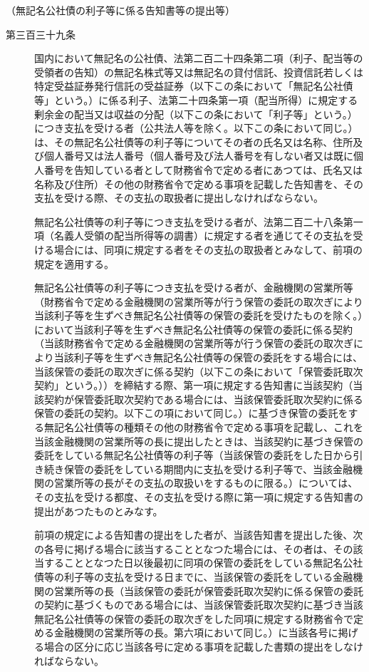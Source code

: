 \documentclass[twocolumn,a4j,10pt]{ltjtarticle}
\begin{document}
\noindent\hspace{10pt}（無記名公社債の利子等に係る告知書等の提出等）
\begin{description}
\item[第三百三十九条]国内において無記名の公社債、法第二百二十四条第二項（利子、配当等の受領者の告知）の無記名株式等又は無記名の貸付信託、投資信託若しくは特定受益証券発行信託の受益証券（以下この条において「無記名公社債等」という。）に係る利子、法第二十四条第一項（配当所得）に規定する剰余金の配当又は収益の分配（以下この条において「利子等」という。）につき支払を受ける者（公共法人等を除く。以下この条において同じ。）は、その無記名公社債等の利子等についてその者の氏名又は名称、住所及び個人番号又は法人番号（個人番号及び法人番号を有しない者又は既に個人番号を告知している者として財務省令で定める者にあつては、氏名又は名称及び住所）その他の財務省令で定める事項を記載した告知書を、その支払を受ける際、その支払の取扱者に提出しなければならない。
\item[]無記名公社債等の利子等につき支払を受ける者が、法第二百二十八条第一項（名義人受領の配当所得等の調書）に規定する者を通じてその支払を受ける場合には、同項に規定する者をその支払の取扱者とみなして、前項の規定を適用する。
\item[]無記名公社債等の利子等につき支払を受ける者が、金融機関の営業所等（財務省令で定める金融機関の営業所等が行う保管の委託の取次ぎにより当該利子等を生ずべき無記名公社債等の保管の委託を受けたものを除く。）において当該利子等を生ずべき無記名公社債等の保管の委託に係る契約（当該財務省令で定める金融機関の営業所等が行う保管の委託の取次ぎにより当該利子等を生ずべき無記名公社債等の保管の委託をする場合には、当該保管の委託の取次ぎに係る契約（以下この条において「保管委託取次契約」という。））を締結する際、第一項に規定する告知書に当該契約（当該契約が保管委託取次契約である場合には、当該保管委託取次契約に係る保管の委託の契約。以下この項において同じ。）に基づき保管の委託をする無記名公社債等の種類その他の財務省令で定める事項を記載し、これを当該金融機関の営業所等の長に提出したときは、当該契約に基づき保管の委託をしている無記名公社債等の利子等（当該保管の委託をした日から引き続き保管の委託をしている期間内に支払を受ける利子等で、当該金融機関の営業所等の長がその支払の取扱いをするものに限る。）については、その支払を受ける都度、その支払を受ける際に第一項に規定する告知書の提出があつたものとみなす。
\item[]前項の規定による告知書の提出をした者が、当該告知書を提出した後、次の各号に掲げる場合に該当することとなつた場合には、その者は、その該当することとなつた日以後最初に同項の保管の委託をしている無記名公社債等の利子等の支払を受ける日までに、当該保管の委託をしている金融機関の営業所等の長（当該保管の委託が保管委託取次契約に係る保管の委託の契約に基づくものである場合には、当該保管委託取次契約に基づき当該無記名公社債等の保管の委託の取次ぎをした同項に規定する財務省令で定める金融機関の営業所等の長。第六項において同じ。）に当該各号に掲げる場合の区分に応じ当該各号に定める事項を記載した書類の提出をしなければならない。

\end{description}
\end{document}
